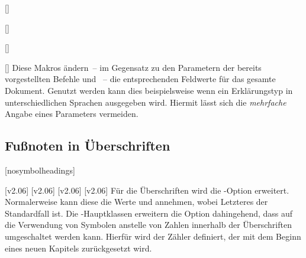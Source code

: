 \begin{Declaration*}{}
\begin{Declaration*}{}
\begin{Declaration*}{}
\begin{Declaration}{[]}
\begin{Declaration}{[]}
\begin{Declaration}{[]}
\begin{Declaration}{[]}
\printdeclarationlist%
%
Diese Makros ändern~-- im Gegensatz zu den Parametern der bereits vorgestellten 
Befehle  und ~-- die entsprechenden 
Feldwerte für das gesamte Dokument. Genutzt werden kann dies beispielsweise 
wenn ein Erklärungstyp in unterschiedlichen Sprachen ausgegeben wird. Hiermit 
lässt sich die \emph{mehrfache} Angabe eines Parameters vermeiden.
%
%
\end{Declaration}
\end{Declaration}
\end{Declaration}
\end{Declaration}


\subsection{Fußnoten in Überschriften}
%
%
%
\begin{Declaration}{}[nosymbolheadings]%
\begin{Declaration}[v2.02]{}%
\printdeclarationlist%
%
[v2.06]
[v2.06]
[v2.06]
[v2.06]
%
Für die Überschriften wird die \KOMAScript-Option  erweitert.
Normalerweise kann diese die Werte  und  
annehmen, wobei Letzteres der Standardfall ist. Die \TUDScript-Hauptklassen 
erweitern die Option dahingehend, dass auf die Verwendung von Symbolen anstelle 
von Zahlen innerhalb der Überschriften umgeschaltet werden kann. Hierfür wird 
der Zähler  definiert, der mit dem Beginn eines neuen 
Kapitels zurückgesetzt wird.


\end{Declaration}
\end{Declaration}
\end{Declaration*}
\end{Declaration*}
\end{Declaration*}
